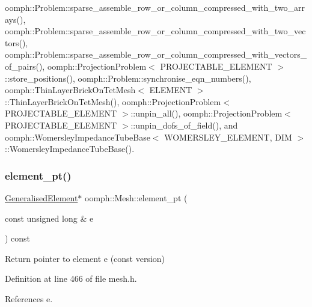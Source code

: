 oomph\+::\+Problem\+::sparse\+\_\+assemble\+\_\+row\+\_\+or\+\_\+column\+\_\+compressed\+\_\+with\+\_\+two\+\_\+arrays(), oomph\+::\+Problem\+::sparse\+\_\+assemble\+\_\+row\+\_\+or\+\_\+column\+\_\+compressed\+\_\+with\+\_\+two\+\_\+vectors(), oomph\+::\+Problem\+::sparse\+\_\+assemble\+\_\+row\+\_\+or\+\_\+column\+\_\+compressed\+\_\+with\+\_\+vectors\+\_\+of\+\_\+pairs(), oomph\+::\+Projection\+Problem$<$ P\+R\+O\+J\+E\+C\+T\+A\+B\+L\+E\+\_\+\+E\+L\+E\+M\+E\+N\+T $>$\+::store\+\_\+positions(), oomph\+::\+Problem\+::synchronise\+\_\+eqn\+\_\+numbers(), oomph\+::\+Thin\+Layer\+Brick\+On\+Tet\+Mesh$<$ E\+L\+E\+M\+E\+N\+T $>$\+::\+Thin\+Layer\+Brick\+On\+Tet\+Mesh(), oomph\+::\+Projection\+Problem$<$ P\+R\+O\+J\+E\+C\+T\+A\+B\+L\+E\+\_\+\+E\+L\+E\+M\+E\+N\+T $>$\+::unpin\+\_\+all(), oomph\+::\+Projection\+Problem$<$ P\+R\+O\+J\+E\+C\+T\+A\+B\+L\+E\+\_\+\+E\+L\+E\+M\+E\+N\+T $>$\+::unpin\+\_\+dofs\+\_\+of\+\_\+field(), and oomph\+::\+Womersley\+Impedance\+Tube\+Base$<$ W\+O\+M\+E\+R\+S\+L\+E\+Y\+\_\+\+E\+L\+E\+M\+E\+N\+T, D\+I\+M $>$\+::\+Womersley\+Impedance\+Tube\+Base().

\mbox{\label{classoomph_1_1Mesh_a3f6428fbd6cb234d04bcef7f1e4fd703}} 
\subsubsection{\texorpdfstring{element\+\_\+pt()}{element\_pt()}\hspace{0.1cm}{\footnotesize\ttfamily [2/4]}}
{\footnotesize\ttfamily \hyperlink{classoomph_1_1GeneralisedElement}{Generalised\+Element}$\ast$ oomph\+::\+Mesh\+::element\+\_\+pt (\begin{DoxyParamCaption}\item[{const unsigned long \&}]{e }\end{DoxyParamCaption}) const\hspace{0.3cm}{\ttfamily [inline]}}



Return pointer to element e (const version) 



Definition at line 466 of file mesh.\+h.



References e.

\mbox{\label{classoomph_1_1Mesh_ab28b03dabf4e247c4a25f834eb11b339}} 

